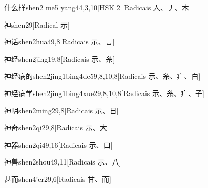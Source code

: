 \begin{entry}{什么样}{shen2 me5 yang4}{4,3,10}[HSK 2][Radicais ⼈、⼃、⽊]
\end{entry}

\begin{entry}{神}{shen2}{9}[Radical ⽰]
\end{entry}

\begin{entry}{神话}{shen2hua4}{9,8}[Radicais ⽰、⾔]
\end{entry}

\begin{entry}{神经}{shen2jing1}{9,8}[Radicais ⽰、⽷]
\end{entry}

\begin{entry}{神经病的}{shen2jing1bing4de5}{9,8,10,8}[Radicais ⽰、⽷、⽧、⽩]
\end{entry}

\begin{entry}{神经病学}{shen2jing1bing4xue2}{9,8,10,8}[Radicais ⽰、⽷、⽧、⼦]
\end{entry}

\begin{entry}{神明}{shen2ming2}{9,8}[Radicais ⽰、⽇]
\end{entry}

\begin{entry}{神奇}{shen2qi2}{9,8}[Radicais ⽰、⼤]
\end{entry}

\begin{entry}{神器}{shen2qi4}{9,16}[Radicais ⽰、⼝]
\end{entry}

\begin{entry}{神兽}{shen2shou4}{9,11}[Radicais ⽰、⼋]
\end{entry}

\begin{entry}{甚而}{shen4'er2}{9,6}[Radicais ⽢、⽽]
\end{entry}


